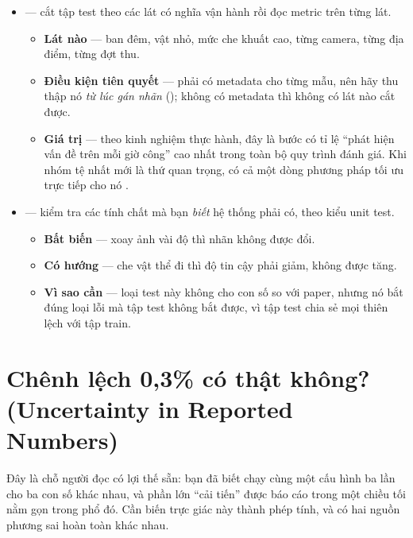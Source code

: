 \documentclass[../../deep_learning.tex]{subfiles}
\begin{document}
\begin{itemize}
\item \textbf{} --- cắt tập test theo các lát có nghĩa vận hành rồi đọc metric trên từng lát.
  \begin{itemize}
  \item \textbf{Lát nào} --- ban đêm, vật nhỏ, mức che khuất cao, từng camera, từng địa điểm, từng đợt thu.
  \item \textbf{Điều kiện tiên quyết} --- phải có metadata cho từng mẫu, nên hãy thu thập nó \emph{từ lúc gán nhãn} (); không có metadata thì không có lát nào cắt được.
  \item \textbf{Giá trị} --- theo kinh nghiệm thực hành, đây là bước có tỉ lệ ``phát hiện vấn đề trên mỗi giờ công'' cao nhất trong toàn bộ quy trình đánh giá. Khi nhóm tệ nhất mới là thứ quan trọng, có cả một dòng phương pháp tối ưu trực tiếp cho nó \cite{sagawa2020groupdro}.
  \end{itemize}
\item \textbf{} --- kiểm tra các tính chất mà bạn \emph{biết} hệ thống phải có, theo kiểu unit test.
  \begin{itemize}
  \item \textbf{Bất biến} --- xoay ảnh vài độ thì nhãn không được đổi.
  \item \textbf{Có hướng} --- che vật thể đi thì độ tin cậy phải giảm, không được tăng.
  \item \textbf{Vì sao cần} --- loại test này không cho con số so với paper, nhưng nó bắt đúng loại lỗi mà tập test không bắt được, vì tập test chia sẻ mọi thiên lệch với tập train.
  \end{itemize}
\end{itemize}

\section{Chênh lệch 0{,}3\%
có thật không? (Uncertainty in Reported Numbers)}
Đây là chỗ người đọc có lợi thế sẵn: bạn đã biết chạy cùng một cấu hình ba lần cho ba con số khác nhau, và phần lớn ``cải tiến'' được báo cáo trong một chiều tối nằm gọn trong phổ đó. Cần biến trực giác này thành phép tính, và có hai nguồn phương sai hoàn toàn khác nhau.
\end{document}

